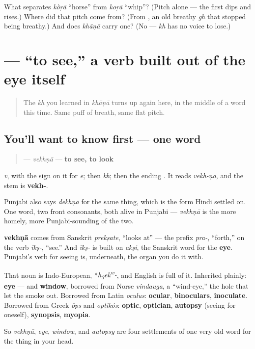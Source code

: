\begin{tcolorbox}[breakable,colback=teal!4,colframe=teal!35!black,title={Before you move on}]
What separates \emph{kòṛā} “horse” from \emph{koṛā} “whip”? (Pitch alone — the first dips and rises.) Where did that pitch come from? (From \textbf{}, an old breathy \emph{gh} that stopped being breathy.) And does \emph{khāṇā} carry one? (No — \textbf{} \emph{kh} has no voice to lose.)
\end{tcolorbox}
\section[\texorpdfstring{\pa{ਵੇਖਣਾ} (vekhṇā)}{ਵੇਖਣਾ (vekhṇā)}]{ — “to see,” a verb built out of the eye itself}

\label{lesson:PA-C07-vekhna}



\begin{quote}
The \textbf{} \emph{kh} you learned in \emph{khāṇā} turns up again here, in the middle of a word this time. Same puff of breath, same flat pitch.
\end{quote}

\subsection*{You'll want to know first — one word}
\begin{quote}
\textbf{} — \emph{vekhṇā} — \textbf{to see, to look}
\end{quote}

\textbf{} \emph{v}, with the \textbf{} sign on it for \emph{e}; then \textbf{} \emph{kh}; then the ending \textbf{}. It reads \emph{vekh-ṇā}, and the stem is \textbf{vekh-}.

Punjabi also says \textbf{} \emph{dekhṇā} for the same thing, which is the form Hindi settled on. One word, two front consonants, both alive in Punjabi — \emph{vekhṇā} is the more homely, more Punjabi-sounding of the two.

\begin{cousinweb}
\textbf{vekhṇā} comes from Sanskrit \emph{prekṣate}, “looks at” — the prefix \emph{pra-}, “forth,” on the verb \emph{īkṣ-}, “see.” And \emph{īkṣ-} is built on \emph{akṣi}, the Sanskrit word for the \textbf{eye}. Punjabi's verb for seeing is, underneath, the organ you do it with.

That noun is Indo-European, *\emph{h\textsubscript{3}ek\textsuperscript{w}-}, and English is full of it. Inherited plainly: \textbf{eye} — and \textbf{window}, borrowed from Norse \emph{vindauga}, a “wind-eye,” the hole that let the smoke out. Borrowed from Latin \emph{oculus}: \textbf{ocular}, \textbf{binoculars}, \textbf{inoculate}. Borrowed from Greek \emph{ōps} and \emph{optikós}: \textbf{optic}, \textbf{optician}, \textbf{autopsy} (seeing for oneself), \textbf{synopsis}, \textbf{myopia}.

So \emph{vekhṇā}, \emph{eye}, \emph{window}, and \emph{autopsy} are four settlements of one very old word for the thing in your head.
\end{cousinweb}

